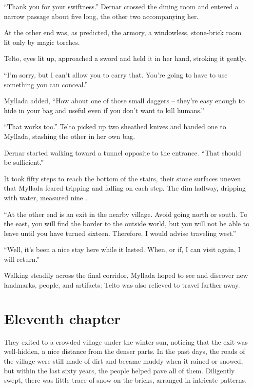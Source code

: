 ``Thank you for your swiftness.'' Dernar crossed the dining room and entered a narrow passage about five \veti{} long, the other two accompanying her.

At the other end was, as predicted, the armory, a windowless, stone-brick room lit only by magic torches.

Telto, eyes lit up, approached a sword and held it in her hand, stroking it gently.

``I'm sorry, but I can't allow you to carry that. You're going to have to use something you can conceal.''

Myllada added, ``How about one of those small daggers -- they're easy enough to hide in your bag and useful even if you don't want to kill humans.''

``That works too.'' Telto picked up two sheathed knives and handed one to Myllada, stashing the other in her own bag.

Dernar started walking toward a tunnel opposite to the entrance. ``That should be sufficient.''

It took fifty steps to reach the bottom of the stairs, their stone surfaces uneven that Myllada feared tripping and falling on each step. The dim hallway, dripping with water, measured nine \eletyn.

``At the other end is an exit in the nearby village. Avoid going north or south. To the east, you will find the border to the outside world, but you will not be able to leave until you have turned sixteen. Therefore, I would advise traveling west.''

``Well, it's been a nice stay here while it lasted. When, or if, I can visit again, I will return.''

Walking steadily across the final corridor, Myllada hoped to see and discover new landmarks, people, and artifacts; Telto was also relieved to travel farther away.

\chapter{Eleventh chapter}

They exited to a crowded village under the winter sun, noticing that the exit was well-hidden, a nice distance from the denser parts. In the past days, the roads of the village were still made of dirt and became muddy when it rained or snowed, but within the last sixty years, the people helped pave all of them. Diligently swept, there was little trace of snow on the bricks, arranged in intricate patterns.

